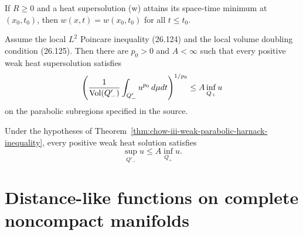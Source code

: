 \begin{corollary}
\label{cor:chow-iii-ricci-flow-strong-maximum-principle}
If \(R\ge0\) and a heat supersolution (w) attains its space-time minimum at
\((x_0,t_0)\), then \(w(x,t)=w(x_0,t_0)\) for all \(t\le t_0\).
\end{corollary}

\begin{theorem}
\label{thm:chow-iii-weak-parabolic-harnack-inequality}
Assume the local \(L^2\) Poincare inequality (26.124) and the local volume
doubling condition (26.125).  Then there are \(p_0>0\) and \(A<\infty\)
such that every positive weak heat supersolution satisfies
\[
 \left(\frac1{\operatorname{Vol}(Q'_-)}\int_{Q'_-}u^{p_0}\,d\mu dt\right)^{1/p_0}
 \le A\inf_{Q_+}u
\]
on the parabolic subregions specified in the source.
\end{theorem}

\begin{theorem}
\label{thm:chow-iii-weak-solution-parabolic-harnack-estimate}
Under the hypotheses of Theorem~\ref{thm:chow-iii-weak-parabolic-harnack-inequality},
every positive weak heat solution satisfies
\[
 \sup_{Q'_-}u\le A\inf_{Q_+}u.
\]
\end{theorem}

\section{Distance-like functions on complete noncompact manifolds}

